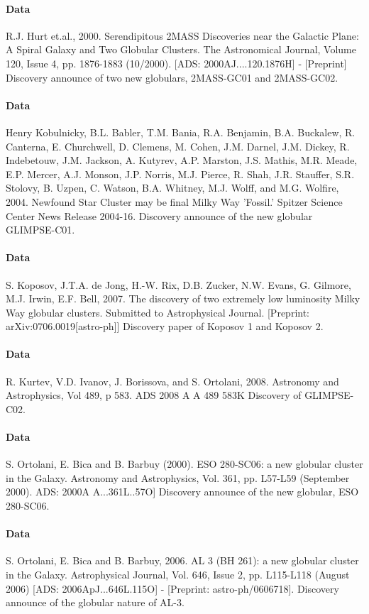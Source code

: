 \documentclass[%
 reprint,
 amsmath,amssymb,
 aps,
]{revtex4-1}
\begin{document}
\paragraph{Data}
R.J. Hurt et.al., 2000. Serendipitous 2MASS Discoveries near the Galactic Plane: A Spiral Galaxy and Two Globular Clusters. The Astronomical Journal, Volume 120, Issue 4, pp. 1876-1883 (10/2000). [ADS: 2000AJ....120.1876H] - [Preprint] Discovery announce of two new globulars, 2MASS-GC01 and 2MASS-GC02.
\paragraph{Data}
Henry Kobulnicky, B.L. Babler, T.M. Bania, R.A. Benjamin, B.A. Buckalew, R. Canterna, E. Churchwell, D. Clemens, M. Cohen, J.M. Darnel, J.M. Dickey, R. Indebetouw, J.M. Jackson, A. Kutyrev, A.P. Marston, J.S. Mathis, M.R. Meade, E.P. Mercer, A.J. Monson, J.P. Norris, M.J. Pierce, R. Shah, J.R. Stauffer, S.R. Stolovy, B. Uzpen, C. Watson, B.A. Whitney, M.J. Wolff, and M.G. Wolfire, 2004. Newfound Star Cluster may be final Milky Way 'Fossil.' Spitzer Science Center News Release 2004-16. Discovery announce of the new globular GLIMPSE-C01.
\paragraph{Data}
S. Koposov, J.T.A. de Jong, H.-W. Rix, D.B. Zucker, N.W. Evans, G. Gilmore, M.J. Irwin, E.F. Bell, 2007. The discovery of two extremely low luminosity Milky Way globular clusters. Submitted to Astrophysical Journal. [Preprint: arXiv:0706.0019[astro-ph]] Discovery paper of Koposov 1 and Koposov 2.
\paragraph{Data}
R. Kurtev, V.D. Ivanov, J. Borissova, and S. Ortolani, 2008. Astronomy and Astrophysics, Vol 489, p 583. ADS 2008 A A 489 583K Discovery of GLIMPSE-C02.
\paragraph{Data}
S. Ortolani, E. Bica and B. Barbuy (2000). ESO 280-SC06: a new globular cluster in the Galaxy. Astronomy and Astrophysics, Vol. 361, pp. L57-L59 (September 2000). ADS: 2000A A...361L..57O] Discovery announce of the new globular, ESO 280-SC06.
\paragraph{Data}
S. Ortolani, E. Bica and B. Barbuy, 2006. AL 3 (BH 261): a new globular cluster in the Galaxy. Astrophysical Journal, Vol. 646, Issue 2, pp. L115-L118 (August 2006) [ADS: 2006ApJ...646L.115O] - [Preprint: astro-ph/0606718]. Discovery announce of the globular nature of AL-3.
\end{document}
